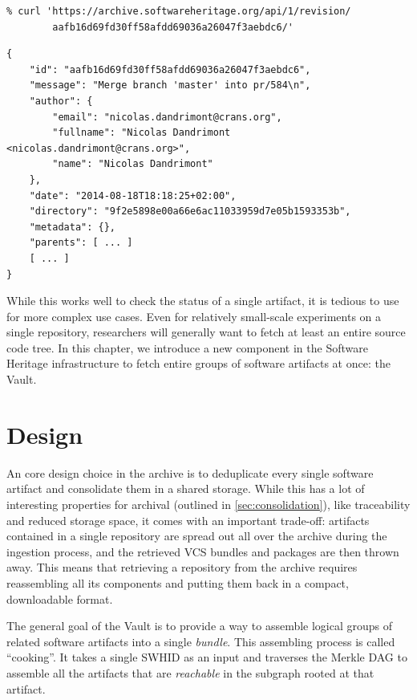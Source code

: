 \begin{minipage}{0.96\textwidth}
\begin{verbatim}
% curl 'https://archive.softwareheritage.org/api/1/revision/
        aafb16d69fd30ff58afdd69036a26047f3aebdc6/'
\end{verbatim}
\begin{verbatim}
{
    "id": "aafb16d69fd30ff58afdd69036a26047f3aebdc6",
    "message": "Merge branch 'master' into pr/584\n",
    "author": {
        "email": "nicolas.dandrimont@crans.org",
        "fullname": "Nicolas Dandrimont <nicolas.dandrimont@crans.org>",
        "name": "Nicolas Dandrimont"
    },
    "date": "2014-08-18T18:18:25+02:00",
    "directory": "9f2e5898e00a66e6ac11033959d7e05b1593353b",
    "metadata": {},
    "parents": [ ... ]
    [ ... ]
}
\end{verbatim}
\end{minipage}

\vspace{1em}

While this works well to check the status of a single artifact, it is tedious
to use for more complex use cases. Even for relatively small-scale experiments
on a single repository, researchers will generally want to fetch at least an
entire source code tree.  In this chapter, we introduce a new component in the
Software Heritage infrastructure to fetch entire groups of software artifacts
at once: the Vault.

\section{Design}

An core design choice in the \SWH{} archive is to deduplicate every single
software artifact and consolidate them in a shared storage. While this has a
lot of interesting properties for archival (outlined in
\cref{sec:consolidation}), like traceability and reduced storage space, it
comes with an important trade-off: artifacts contained in a single repository
are spread out all over the archive during the ingestion process, and the
retrieved \gls{VCS} bundles and packages are then thrown away. This means that
retrieving a repository from the archive requires reassembling all its
components and putting them back in a compact, downloadable format.

The general goal of the Vault is to provide a way to assemble logical groups of
related software artifacts into a single \emph{bundle}. This assembling process
is called ``cooking''. It takes a single \gls{SWHID} as an input and traverses
the Merkle DAG to assemble all the artifacts that are \emph{reachable} in the
subgraph rooted at that artifact.

